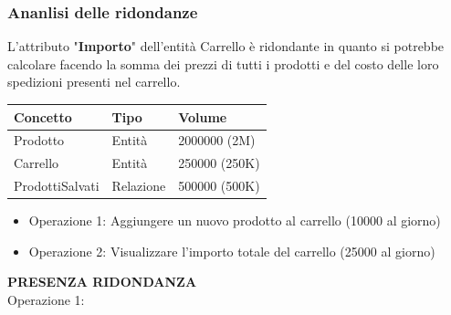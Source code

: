 \documentclass[10pt]{article}
\begin{document}
\subsubsection{Ananlisi delle ridondanze}

L'attributo "\textbf{Importo}" dell'entità Carrello è ridondante in quanto si potrebbe calcolare facendo la somma dei prezzi
di tutti i prodotti e del costo delle loro spedizioni presenti nel carrello.

\begin{tabularx}{\textwidth} {
        | >{\raggedright\arraybackslash}X |
          >{\raggedright\arraybackslash}X |
          >{\raggedright\arraybackslash}X |
      }

        \hline
        \textbf{Concetto} & \textbf{Tipo} & \textbf{Volume} \\
        \hline

        Prodotto  &
        Entità &
        2000000 (2M) \\
        \hline

        Carrello  &
        Entità &
        250000 (250K) \\
        \hline

        ProdottiSalvati  &
        Relazione &
        500000 (500K) \\
        \hline
    
\end{tabularx}

\begin{itemize}
    \itemsep0em 
    \item Operazione 1: Aggiungere un nuovo prodotto al carrello (10000 al giorno)
    \item Operazione 2: Visualizzare l'importo totale del carrello (25000 al giorno)
\end{itemize}
\textbf{PRESENZA RIDONDANZA}\\
Operazione 1:
\end{document}
